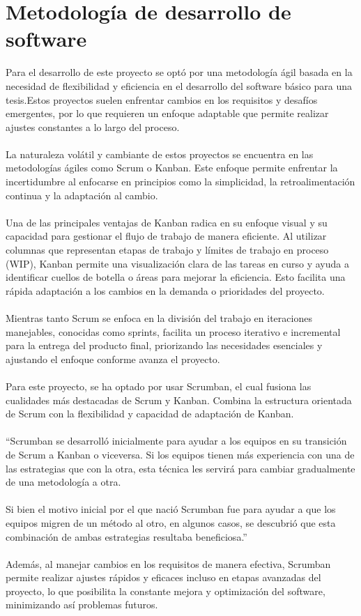 \section{Metodología de desarrollo de software}
Para el desarrollo de este proyecto se optó por una metodología ágil basada en la  necesidad de flexibilidad y eficiencia en el desarrollo del software básico para una tesis.Estos proyectos suelen enfrentar cambios en los requisitos y desafíos emergentes, por lo que requieren un enfoque adaptable que permite realizar ajustes constantes a lo largo del proceso.
\\ \\
La naturaleza volátil y cambiante de estos proyectos se encuentra en las metodologías ágiles como Scrum o Kanban. Este enfoque permite enfrentar la incertidumbre al enfocarse en principios como la simplicidad, la retroalimentación continua y la adaptación al cambio.
\\ \\
Una de las principales ventajas de Kanban radica en su enfoque visual y su capacidad para gestionar el flujo de trabajo de manera eficiente. Al utilizar columnas que representan etapas de trabajo y límites de trabajo en proceso (WIP), Kanban permite una visualización clara de las tareas en curso y ayuda a identificar cuellos de botella o áreas para mejorar la eficiencia. Esto facilita una rápida adaptación a los cambios en la demanda o prioridades del proyecto.
\\ \\
Mientras tanto Scrum se enfoca en la división del trabajo en iteraciones manejables, conocidas como sprints, facilita un proceso iterativo e incremental para la entrega del producto final, priorizando las necesidades esenciales y ajustando el enfoque conforme avanza el proyecto.
\\ \\
Para este proyecto, se ha optado por usar Scrumban, el cual fusiona las cualidades más destacadas de Scrum y Kanban. Combina la estructura orientada de Scrum con la flexibilidad y capacidad de adaptación de Kanban. 
\\ \\
“Scrumban se desarrolló inicialmente para ayudar a los equipos en su transición de Scrum a Kanban o viceversa. Si los equipos tienen más experiencia con una de las estrategias que con la otra, esta técnica les servirá para cambiar gradualmente de una metodología a otra. 
\\ \\
Si bien el motivo inicial por el que nació Scrumban fue para ayudar a que los equipos migren de un método al otro, en algunos casos, se descubrió que esta combinación de ambas estrategias resultaba beneficiosa.”\cite{p}
\\ \\
Además, al manejar cambios en los requisitos de manera efectiva, Scrumban permite realizar ajustes rápidos y eficaces incluso en etapas avanzadas del proyecto, lo que posibilita la constante mejora y optimización del software, minimizando así problemas futuros.

